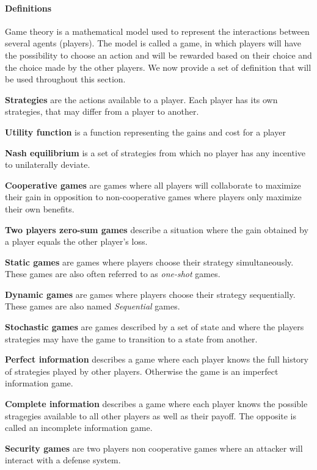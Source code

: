 \paragraph{Definitions}
Game theory is a mathematical model used to represent the interactions between several agents (\ie players).
The model is called a game, in which players will have the possibility to choose an action and will be rewarded based on their choice and the choice made by the other players.
We now provide a set of definition that will be used throughout this section.

\textbf{Strategies} are the actions available to a player. Each player has its own strategies, that may differ from a player to another.

\textbf{Utility function} is a function representing the gains and cost for a player

\textbf{Nash equilibrium} is a set of strategies from which no player has any incentive to unilaterally deviate.

\textbf{Cooperative games} are games where all players will collaborate to maximize their gain in opposition to non-cooperative games where players only maximize their own benefits.

\textbf{Two players zero-sum games} describe a situation where the gain obtained by a player equals the other player's loss.

\textbf{Static games} are games where players choose their strategy simultaneously. These games are also often referred to as \textit{one-shot} games.

\textbf{Dynamic games} are games where players choose their strategy sequentially. These games are also named \textit{Sequential} games.

\textbf{Stochastic games} are games described by a set of state and where the players strategies may have the game to transition to a state from another.

\textbf{Perfect information} describes a game where each player knows the full history of strategies played by other players. Otherwise the game is an imperfect information game.

\textbf{Complete information} describes a game where each player knows the possible stragegies available to all other players as well as their payoff. The opposite is called an incomplete information game.

\textbf{Security games} are two players non cooperative games where an attacker will interact with a defense system.

